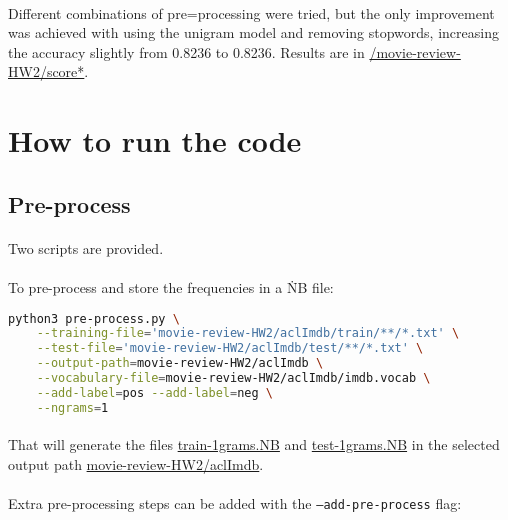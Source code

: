\documentclass{article}
\begin{document}
\paragraph{} Different combinations of pre=processing were tried, but the only improvement was achieved with using the unigram model and removing stopwords, increasing the accuracy slightly from 0.8236 to 0.8236\@. Results are in \url{/movie-review-HW2/score*}\@.

\clearpage

\section*{How to run the code}

\subsection*{Pre-process}

\paragraph{} Two scripts are provided.

\paragraph{} To pre-process and store the frequencies in a \.NB file:

\begin{lstlisting}[language=bash]
python3 pre-process.py \
    --training-file='movie-review-HW2/aclImdb/train/**/*.txt' \
    --test-file='movie-review-HW2/aclImdb/test/**/*.txt' \
    --output-path=movie-review-HW2/aclImdb \
    --vocabulary-file=movie-review-HW2/aclImdb/imdb.vocab \
    --add-label=pos --add-label=neg \
    --ngrams=1
\end{lstlisting}

\paragraph{} That will generate the files \url{train-1grams.NB} and \url{test-1grams.NB} in the selected output path \url{movie-review-HW2/aclImdb}.

\paragraph{} Extra pre-processing steps can be added with the \texttt{--add-pre-process} flag:
\end{document}
